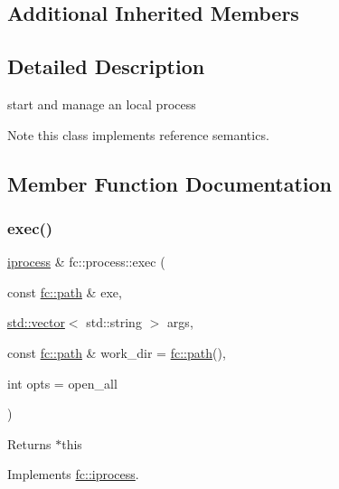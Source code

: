\subsection*{Additional Inherited Members}


\subsection{Detailed Description}
start and manage an local process 

\begin{DoxyNote}{Note}
this class implements reference semantics. 
\end{DoxyNote}


\subsection{Member Function Documentation}
\mbox{\label{classfc_1_1process_aa663b2fe8d58228224d0c1a954554a46}} 
\subsubsection{\texorpdfstring{exec()}{exec()}}
{\footnotesize\ttfamily \mbox{\hyperlink{classfc_1_1iprocess}{iprocess}} \& fc\+::process\+::exec (\begin{DoxyParamCaption}\item[{const \mbox{\hyperlink{classfc_1_1path}{fc\+::path}} \&}]{exe,  }\item[{\mbox{\hyperlink{classstd_1_1vector}{std\+::vector}}$<$ std\+::string $>$}]{args,  }\item[{const \mbox{\hyperlink{classfc_1_1path}{fc\+::path}} \&}]{work\+\_\+dir = {\ttfamily \mbox{\hyperlink{classfc_1_1path}{fc\+::path}}()},  }\item[{int}]{opts = {\ttfamily open\+\_\+all} }\end{DoxyParamCaption})\hspace{0.3cm}{\ttfamily [virtual]}}

\begin{DoxyReturn}{Returns}
$\ast$this 
\end{DoxyReturn}


Implements \mbox{\hyperlink{classfc_1_1iprocess_a3f0415eda607b44ed96732c354f198e0}{fc\+::iprocess}}.

\mbox{\label{classfc_1_1process_a159c67b1fcff5dffb6678d15090ab335}} 
